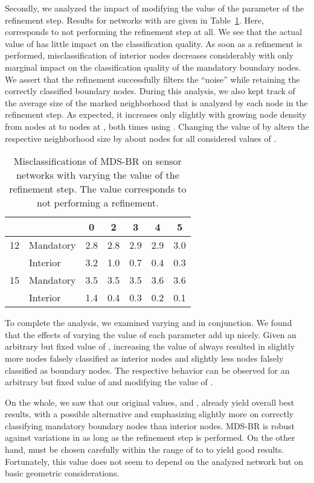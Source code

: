 \documentclass{llncs}
\begin{document}
Secondly, we analyzed the impact of modifying the value of the  parameter of the refinement step. 
Results for networks with  are given in Table~\ref{tab:mdsbr_rmin}.
Here,  corresponds to not performing the refinement step at all.
We see that the actual value of  has little impact on the classification quality.
As soon as a refinement is performed, misclassification of interior nodes decreases considerably with only marginal impact on the classification quality of the mandatory boundary nodes.
We assert that the refinement successfully filters the ``noise'' while retaining the correctly classified boundary nodes.
During this analysis, we also kept track of the average size of the marked neighborhood that is analyzed by each node in the refinement step.
As expected, it increases only slightly with growing node density from  nodes at  to  nodes at , both times using .
Changing the value of  by  alters the respective neighborhood size by about  nodes for all considered values of .

\begin{table}[tb]
\setlength\tabcolsep{5pt}
\centering
\caption{Misclassifications of MDS-BR on sensor networks with  varying the  value of the refinement step. The value  corresponds to not performing a refinement.}\label{tab:mdsbr_rmin}
\begin{tabular}{cl||ccccc}
   &  & 0 & 2 & 3 & 4 & 5 \\
\hline
12 & Mandatory & 2.8 & 2.8 & 2.9 & 2.9 & 3.0 \\
   & Interior  & 3.2 & 1.0 & 0.7 & 0.4 & 0.3 \\
15 & Mandatory & 3.5 & 3.5 & 3.5 & 3.6 & 3.6 \\
   & Interior  & 1.4 & 0.4 & 0.3 & 0.2 & 0.1
\end{tabular}
\end{table}

To complete the analysis, we examined varying  and  in conjunction.
We found that the effects of varying the value of each parameter add up nicely.
Given an arbitrary but fixed value of , increasing the value of  always resulted in slightly more nodes falsely classified as interior nodes and slightly less nodes falsely classified as boundary nodes.
The respective behavior can be observed for an arbitrary but fixed value of  and modifying the value of .

On the whole, we saw that our original values,  and , already yield overall best results, with a possible alternative  and  emphasizing slightly more on correctly classifying mandatory boundary nodes than interior nodes.
MDS-BR is robust against variations in  as long as the refinement step is performed.
On the other hand,  must be chosen carefully within the range of  to  to yield good results.
Fortunately, this value does not seem to depend on the analyzed network but on basic geometric considerations.
\end{document}

